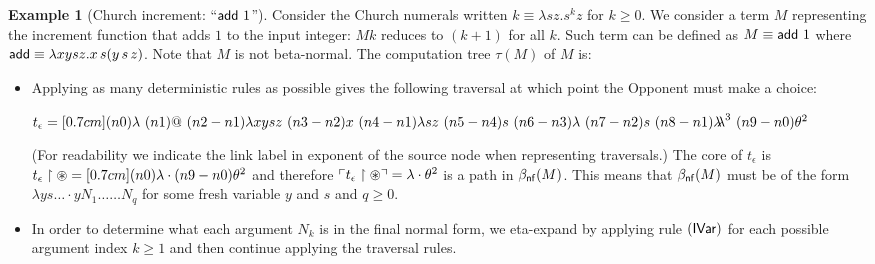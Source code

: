 \documentclass{article}
\theoremstyle{definition}
\newtheorem{example}{Example}[section]
\newcommand{\ghostlmd}{{\lambda\!\!\lambda}}
\newcommand{\ghostvar}{\theta}
\begin{document}
\begin{example}[Church increment: ``${\sf add}\ 1$'']
Consider the Church numerals written $k \equiv \lambda s z . s^k z$ for $k\geq0$. We consider a term $M$ representing the increment function that adds $1$ to the input integer: $M k$ reduces to $(k+1)$ for all $k$. Such term can be defined as $M \equiv{\sf add}\ 1$ where
${\sf add} \equiv \lambda x y s z. x\, s (y\, s\, z)$.
Note that $M$ is not beta-normal.
The computation tree $\tau(M)$ of $M$ is:

\begin{itemize}
\item Applying as many deterministic rules as possible gives the following traversal at which point the Opponent must make a choice:

$t_\epsilon = \Pstr[0.7cm]{(n0){\lambda }\ (n1){@}\ (n2-n1){\lambda x y s z}\ (n3-n2){x}\ (n4-n1){\lambda s z}\ (n5-n4){s}\ (n6-n3){\lambda }\ (n7-n2){s}\ (n8-n1){\ghostlmd^3}\ (n9-n0){\ghostvar^2} }$

(For readability we indicate the link label in exponent of the source node when representing traversals.)
The core of $t_\epsilon$ is
$t_\epsilon\filter\theroot = \Pstr[0.7cm]{(n0){\lambda } \cdot (n9-n0){{\ghostvar^2}} }$
and therefore $\pview{t_\epsilon\filter\theroot} =  \lambda \cdot \ghostvar^2$ is a path in  $\beta_{\sf nf}(M)$.
This means that $\beta_{\sf nf}(M)$ must be of the form $\lambda y s \ldots \cdot y N_1 \ldots \ldots N_q$ for some fresh variable $y$ and $s$ and $q\geq0$.

\item In order to determine what each argument $N_k$ is in the final normal form, we eta-expand by applying rule $\mathbf{({\sf IVar})}$ for each possible argument index $k\geq 1$ and then continue applying the traversal rules.


\end{itemize}
\end{example}
\end{document}
